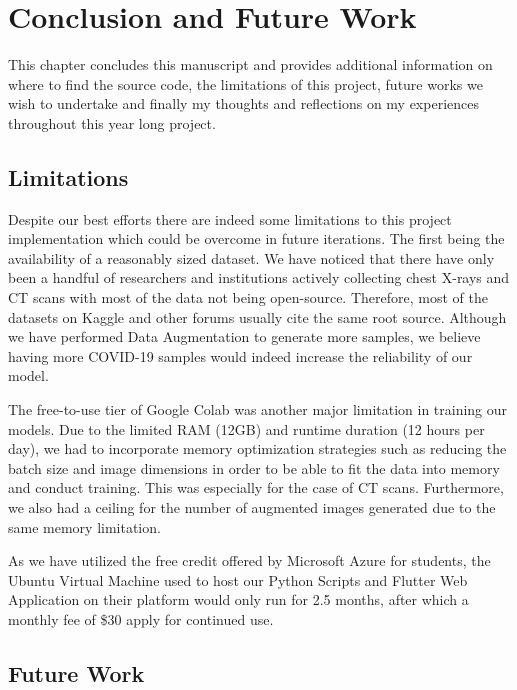 \chapter{Conclusion and Future Work} \label{Conclusion and Future Works}

This chapter concludes this manuscript and provides additional information on where to find the source code, the limitations of this project, future works we wish to undertake and finally my thoughts and reflections on my experiences throughout this year long project.

\section{Limitations}

Despite our best efforts there are indeed some limitations to this project implementation which could be overcome in future iterations. The first being the availability of a reasonably sized dataset. We have noticed that there have only been a handful of researchers and institutions actively collecting chest X-rays and CT scans with most of the data not being open-source. Therefore, most of the datasets on Kaggle and other forums usually cite the same root source. Although we have performed Data Augmentation to generate more samples, we believe having more COVID-19 samples would indeed increase the reliability of our model.

The free-to-use tier of Google Colab was another major limitation in training our models. Due to the limited RAM (12GB) and runtime duration (12 hours per day), we had to incorporate memory optimization strategies such as reducing the batch size and image dimensions in order to be able to fit the data into memory and conduct training. This was especially for the case of CT scans. Furthermore, we also had a ceiling for the number of augmented images generated due to the same memory limitation.

As we have utilized the free credit offered by Microsoft Azure for students, the Ubuntu Virtual Machine used to host our Python Scripts and Flutter Web Application on their platform would only run for 2.5 months, after which a monthly fee of \$30 apply for continued use. 

\section{Future Work}

